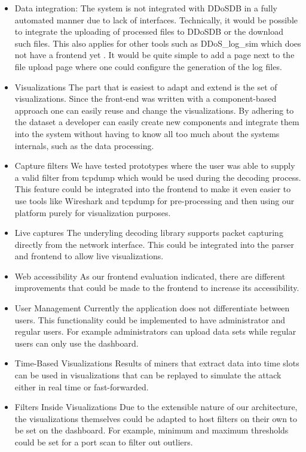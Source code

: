 \begin{itemize}
    \item Data integration:
    The system is not integrated with DDoSDB in a fully automated manner due to lack of interfaces. Technically, it would be possible to integrate the uploading  of processed files to DDoSDB or the download such files.
    This also applies for other tools such as DDoS\_log\_sim which does not have a frontend yet \cite{ddoslogsim}. It would be quite simple to add a page next to the file upload page where one could configure the generation of the log files.
    
    \item Visualizations
    The part that is easiest to adapt and extend is the set of visualizations. Since the front-end was written with a component-based approach one can easily reuse and change the visualizations. By adhering to the dataset a developer can easily create new components and integrate them into the system without having to know all too much about the systems internals, such as the data processing.
    
    \item Capture filters
    We have tested prototypes where the user was able to supply a valid filter from tcpdump which would be used during the decoding process. This feature could be integrated into the frontend to make it even easier to use tools like Wireshark and tcpdump for pre-processing and then using our platform purely for visualization purposes.
    
    \item Live captures
    The underyling decoding library supports packet capturing directly from the network interface. This could be integrated into the parser and frontend to allow live visualizations.
    
    \item Web accessibility
    As our frontend evaluation indicated, there are different improvements that could be made to the frontend to increase its accessibility.
    
    \item User Management
    Currently the application does not differentiate between users. This functionality could be implemented to have administrator and regular users. For example administrators can upload data sets while regular users can only use the dashboard.
    
    \item Time-Based Visualizations
    Results of miners that extract data into time slots can be used in visualizations that can be replayed to simulate the attack either in real time or fast-forwarded.
    
    \item Filters Inside Visualizations
    Due to the extensible nature of our architecture, the visualizations themselves could be adapted to host filters on their own to be set on the dashboard. For example, minimum and maximum thresholds could be set for a port scan to filter out outliers.
    
\end{itemize}
